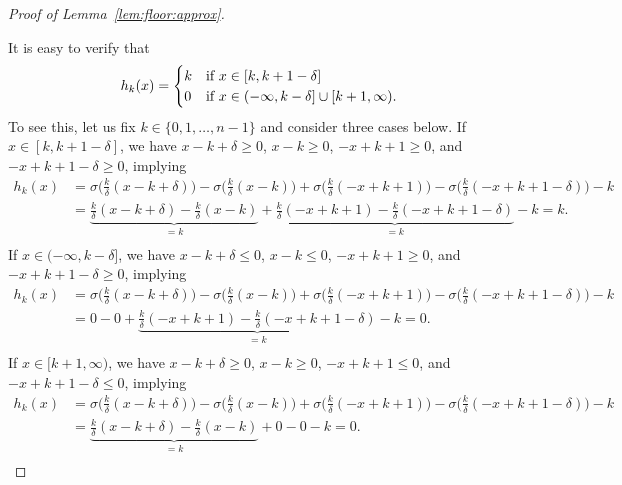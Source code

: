 \documentclass[nohyperref]{article}
\theoremstyle{plain}
\theoremstyle{definition}
\theoremstyle{remark}
\begin{document}
\begin{proof}[Proof of Lemma~\ref{lem:floor:approx}]
\begin{figure}[ht]
\end{figure}
  
  
  It is easy to verify that
		\begin{equation*}
			h_k(x)=\begin{cases}
				k & \textnormal{if}\ x\in [k,k+1-\delta]\\
				0 &  \textnormal{if}\ x\in (-\infty,k-\delta]\cup[k+1,\infty).
			\end{cases}
		\end{equation*}
To see this, let us fix $k\in \{0,1,\dotsc,n-1\}$ and consider three cases below.
If $x\in [k,k+1-\delta]$, we have $x-k+\delta\ge 0$, $x-k\ge 0$, $-x+k+1\ge 0$, and $-x+k+1-\delta \ge 0$, implying
\begin{equation*}
	\begin{split}
		h_k(x)&=
		\sigma\big(\tfrac{k}{\delta}(x-k+\delta)\big)
		- \sigma\big(\tfrac{k}{\delta}(x-k)\big)
		+\sigma\big(\tfrac{k}{\delta}(-x+k+1)\big)
		-\sigma\big(\tfrac{k}{\delta}(-x+k+1-\delta)\big)-k\\
		&=
		\underbrace{\tfrac{k}{\delta}(x-k+\delta)
			- \tfrac{k}{\delta}(x-k)}_{=k}
		+
			\underbrace{\tfrac{k}{\delta}(-x+k+1)
		-\tfrac{k}{\delta}(-x+k+1-\delta)}_{=k}-k=k.\\
	\end{split}
\end{equation*}
	If $x\in (-\infty,k-\delta]$, we have $x-k+\delta\le 0$, $x-k\le 0$, $-x+k+1\ge 0$, and $-x+k+1-\delta \ge 0$, implying
\begin{equation*}
	\begin{split}
		h_k(x)&=
		\sigma\big(\tfrac{k}{\delta}(x-k+\delta)\big)
		- \sigma\big(\tfrac{k}{\delta}(x-k)\big)
		+\sigma\big(\tfrac{k}{\delta}(-x+k+1)\big)
		-\sigma\big(\tfrac{k}{\delta}(-x+k+1-\delta)\big)-k\\
		&=
		0
			- 0
		+
		\underbrace{\tfrac{k}{\delta}(-x+k+1)
			-\tfrac{k}{\delta}(-x+k+1-\delta)}_{=k}-k=0.\\
	\end{split}
\end{equation*}
	If $x\in [k+1,\infty)$, we have $x-k+\delta\ge 0$, $x-k\ge 0$, $-x+k+1\le 0$, and $-x+k+1-\delta \le 0$, implying
\begin{equation*}
	\begin{split}
		h_k(x)&=
		\sigma\big(\tfrac{k}{\delta}(x-k+\delta)\big)
		- \sigma\big(\tfrac{k}{\delta}(x-k)\big)
		+\sigma\big(\tfrac{k}{\delta}(-x+k+1)\big)
		-\sigma\big(\tfrac{k}{\delta}(-x+k+1-\delta)\big)-k\\
		&=
		\underbrace{\tfrac{k}{\delta}(x-k+\delta)
			- \tfrac{k}{\delta}(x-k)}_{=k}
		+
		0
			-0-k=0.\\
	\end{split}
\end{equation*}



\end{proof}
\end{document}
